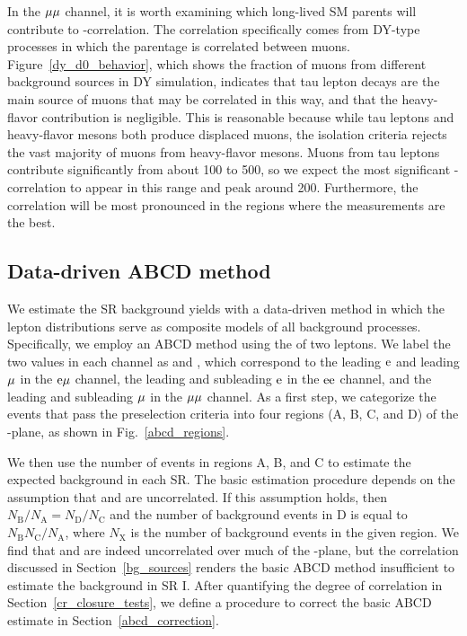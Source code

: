 In the ${\mu}{\mu}$ channel, it is worth examining which long-lived SM parents will contribute to \ad-\ad correlation. The correlation specifically comes from DY-type processes in which the parentage is correlated between muons. Figure~\ref{dy_d0_behavior}, which shows the fraction of muons from different background sources in DY simulation, indicates that tau lepton decays are the main source of muons that may be correlated in this way, and that the heavy-flavor contribution is negligible. This is reasonable because while tau leptons and heavy-flavor mesons both produce displaced muons, the isolation criteria rejects the vast majority of muons from heavy-flavor mesons.  Muons from tau leptons contribute significantly from about 100 to 500\mum, so we expect the most significant \ad-\ad correlation to appear in this range and peak around 200\mum. Furthermore, the correlation will be most pronounced in the regions where the \ad measurements are the best.



\subsection{Data-driven ABCD method}
\label{abcd}
We estimate the SR background yields with a data-driven method in which the lepton \ad distributions serve as composite models of all background processes. Specifically, we employ an ABCD method using the \ad of two leptons. We label the two \ad values in each channel as \ada and \adb, which correspond to the leading $\mathrm{e}$ and leading ${\mu}$ in the $\mathrm{e}{\mu}$ channel, the leading and subleading $\mathrm{e}$ in the $\mathrm{e}\mathrm{e}$ channel, and the leading and subleading ${\mu}$ in the ${\mu}{\mu}$ channel. As a first step, we categorize the events that pass the preselection criteria into four regions (A, B, C, and D) of the \ada-\adb plane, as shown in Fig.~\ref{abcd_regions}.



We then use the number of events in regions A, B, and C to estimate the expected background in each SR. The basic estimation procedure depends on the assumption that \ada and \adb are uncorrelated. If this assumption holds, then $N_{\text{B}}/N_{\text{A}}=N_{\text{D}}/N_{\text{C}}$ and the number of background events in D is equal to $N_{\text{B}}N_{\text{C}}/N_{\text{A}}$, where $N_{\text{X}}$ is the number of background events in the given region. We find that \ada and \adb are indeed uncorrelated over much of the \ad-\ad plane, but the correlation discussed in Section~\ref{bg_sources} renders the basic ABCD method insufficient to estimate the background in SR I. After quantifying the degree of correlation in Section~\ref{cr_closure_tests}, we define a procedure to correct the basic ABCD estimate in Section~\ref{abcd_correction}.

